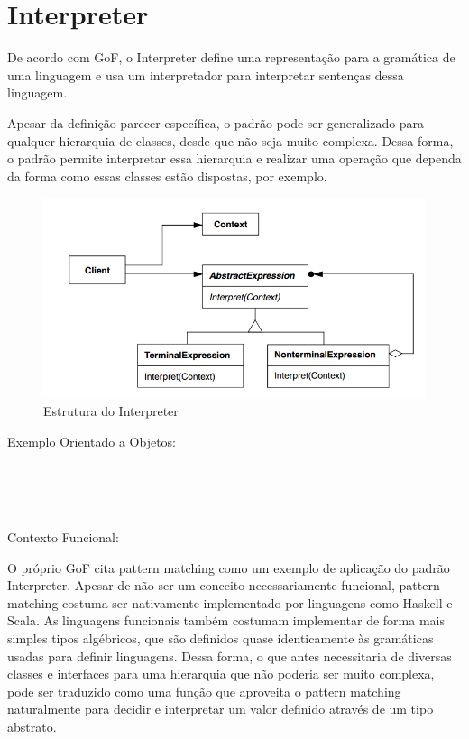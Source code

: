 \section{Interpreter}

De acordo com GoF, o Interpreter define uma representação para 
a gramática de uma linguagem e usa um interpretador para 
interpretar sentenças dessa linguagem.

Apesar da definição parecer específica, o padrão pode ser 
generalizado para qualquer hierarquia de classes, desde que 
não seja muito complexa. Dessa forma, o padrão permite 
interpretar essa hierarquia e realizar uma operação que 
dependa da forma como essas classes estão dispostas, por 
exemplo.

\begin{figure}[htb]
	\caption{\label{fig_grafico}Estrutura do Interpreter}
	\begin{center}
	    \includegraphics[scale=0.5]{5_padroes-contexto-funcional/5.3_comportamentais/5.3.03_interpreter/diagram.png}
	\end{center}
\end{figure}

Exemplo Orientado a Objetos:

\begin{lstlisting}[caption={Interpreter Orientação a Objetos},label=oointerpreter]


    
\end{lstlisting}

Contexto Funcional:

O próprio GoF cita pattern matching como um exemplo de 
aplicação do padrão Interpreter. Apesar de não ser um 
conceito necessariamente funcional, pattern matching costuma 
ser nativamente implementado por linguagens como Haskell e 
Scala. As linguagens funcionais também costumam implementar 
de forma mais simples tipos algébricos, que são definidos 
quase identicamente às gramáticas usadas para definir 
linguagens. Dessa forma, o que antes necessitaria de diversas 
classes e interfaces para uma hierarquia que não poderia 
ser muito complexa, pode ser traduzido como uma função 
que aproveita o pattern matching naturalmente para decidir 
e interpretar um valor definido através de um tipo abstrato.

\begin{lstlisting}[caption={Interpreter Funcional},label=fpinterpreter]
    

    
\end{lstlisting}